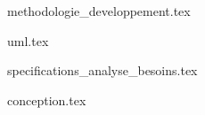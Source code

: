 
%
{methodologie_developpement.tex}

% 
{uml.tex}

% 
{specifications_analyse_besoins.tex}


% 
{conception.tex}